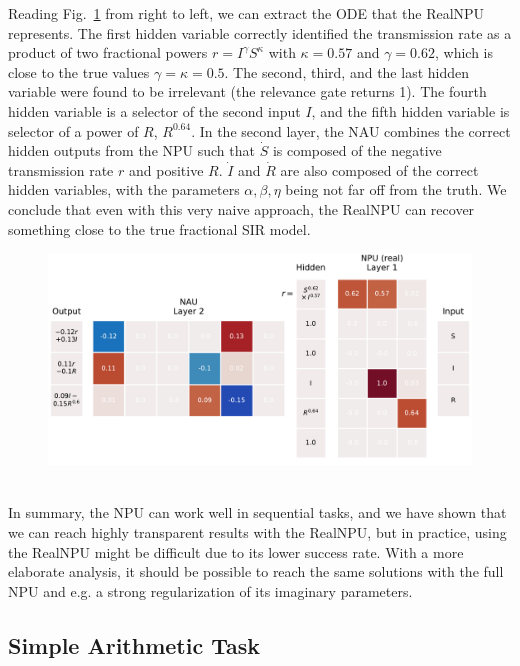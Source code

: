 \documentclass[9pt]{article}
\begin{document}
Reading Fig.~\ref{fig:sir_gatednpu_modelps} from right to left, we can extract
the ODE that the RealNPU represents.  The first hidden variable correctly
identified the transmission rate as a product of two fractional powers $r =
I^\gamma S^\kappa$ with $\kappa=0.57$ and $\gamma=0.62$, which is close to the
true values $\gamma=\kappa=0.5$. The second, third, and the last hidden variable
were found to be irrelevant (the relevance gate returns 1). The fourth hidden
variable is a selector of the second input $I$, and the fifth hidden variable
is selector of a power of $R$, $R^{0.64}$. In the second layer, the NAU combines
the correct hidden outputs from the NPU such that $\dot S$ is composed of the
negative transmission rate $r$ and positive $R$.  $\dot I$ and $\dot R$ are
also composed of the correct hidden variables, with the parameters
$\alpha,\beta,\eta$ being not far off from the truth.  We conclude that even
with this very naive approach, the RealNPU can recover something close to the
true fractional SIR model.
\begin{figure}
  \centering
  \includegraphics[width=.8\linewidth]{../plots/sir_gatednpu_modelps.pdf}
  \label{fig:sir_gatednpu_modelps}
\end{figure}
\\
In summary, the NPU can work well in sequential tasks, and we have shown
that we can reach highly transparent results with the RealNPU, but in practice,
using the RealNPU might be difficult due to its lower success rate. With a more
elaborate analysis, it should be possible to reach the same solutions with the
full NPU and e.g. a strong regularization of its imaginary parameters.



\subsection{Simple Arithmetic Task}%
\label{sub:simple_arithmetic_task}
\end{document}
